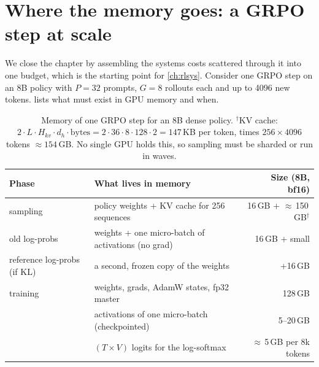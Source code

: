 \section{Where the memory goes: a GRPO step at scale}\label{sec:grpo:systems}

We close the chapter by assembling the systems costs scattered through it into one budget,
which is the starting point for \cref{ch:rlsys}. Consider one GRPO step on an 8B policy with
$P=32$ prompts, $G=8$ rollouts each and up to 4096 new tokens.  lists
what must exist in GPU memory and when.

\begin{table}[ht]
\centering\small
\begin{tabularx}{\linewidth}{@{}lXr@{}}
\toprule
Phase & What lives in memory & Size (8B, bf16)\\
\midrule
sampling & policy weights + KV cache for 256 sequences & 16\,GB + $\approx$\,150\,GB$^\dagger$\\
old log-probs & weights + one micro-batch of activations (no grad) & 16\,GB + small\\
reference log-probs (if KL) & a second, frozen copy of the weights & +16\,GB\\
training & weights, grads, AdamW states, fp32 master & 128\,GB\\
 & activations of one micro-batch (checkpointed) & 5--20\,GB\\
 & $(T\times V)$ logits for the log-softmax & $\approx$\,5\,GB per 8k tokens\\
\bottomrule
\end{tabularx}
\caption{Memory of one GRPO step for an 8B dense policy. $^\dagger$KV cache:
$2\cdot L\cdot H_{kv}\cdot d_h\cdot\text{bytes}=2\cdot36\cdot8\cdot128\cdot2=147$\,KB per
token, times $256\times4096$ tokens $\approx154$\,GB. No single GPU holds this, so sampling
must be sharded or run in waves.}
\label{tab:grpo:budget}
\end{table}

